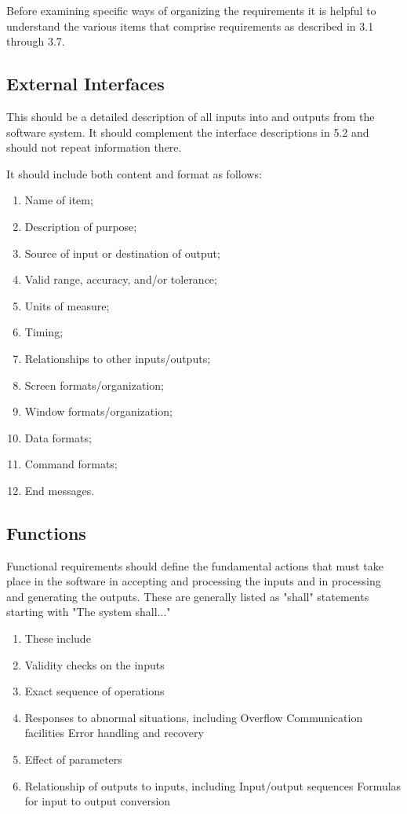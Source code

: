 \documentclass[draftclsnofoot,onecolumn,10pt]{IEEEtran}
\begin{document}
Before examining specific ways of organizing the requirements it is helpful to
understand the various items that comprise requirements as described in 3.1
through 3.7.

\subsection{External Interfaces}

This should be a detailed description of all inputs into and outputs from the
software system. It should complement the interface descriptions in 5.2 and
should not repeat information there.

It should include both content and format as follows:
\begin{enumerate}
	\item Name of item;
	\item Description of purpose;
	\item Source of input or destination of output;
	\item Valid range, accuracy, and/or tolerance;
	\item Units of measure;
	\item Timing;
	\item Relationships to other inputs/outputs;
	\item Screen formats/organization;
	\item Window formats/organization;
	\item Data formats;
	\item Command formats;
	\item End messages.
\end{enumerate}

\subsection{Functions}
Functional requirements should define the fundamental actions that must take
place in the software in accepting and processing the inputs and in processing
and generating the outputs. These are generally listed as "shall" statements
starting with "The system shall..."

\begin{enumerate}
	\item These include
	\item Validity checks on the inputs
	\item Exact sequence of operations
	\item Responses to abnormal situations, including
		\subitem Overflow
		\subitem Communication facilities
		\subitem Error handling and recovery
	\item Effect of parameters
	\item Relationship of outputs to inputs, including
		\subitem Input/output sequences
		\subitem Formulas for input to output conversion
\end{enumerate}
\end{document}
